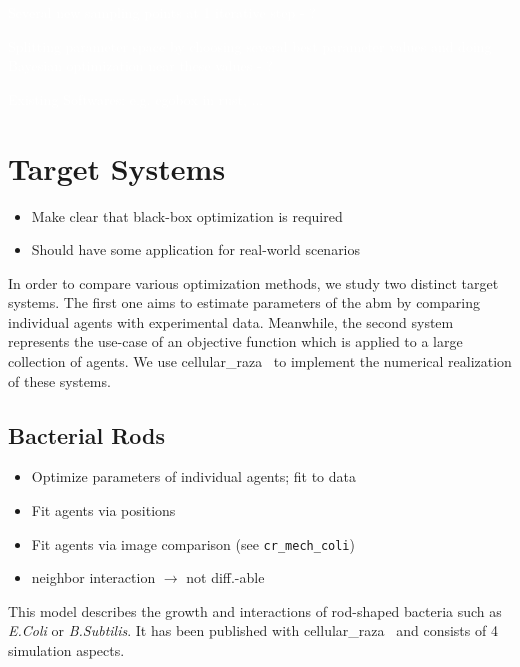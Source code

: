 \documentclass{article}
\newcommand{\todo}[1]{\colorbox{WildStrawberry}{\textcolor{white}{#1}}}
\begin{document}
\todo{Several new sampling points at 1 iterative step - ?}

\todo{Splitting parameter space by choosing several best parameter values and doing Bayesian optimization near these values - ?}

\todo{Existing Softwares: e.g. egobox in rust, ...}




\section{Target Systems}
\label{section:target-system}
\begin{itemize}
    \item Make clear that black-box optimization is required
    \item Should have some application for real-world scenarios
\end{itemize}

In order to compare various optimization methods, we study two distinct target systems.
The first one aims to estimate parameters of the \ac{abm} by comparing individual agents with
experimental data.
Meanwhile, the second system represents the use-case of an objective function which is applied to a
large collection of agents.
We use cellular\_raza~\cite{Pleyer2025} to implement the numerical realization of these systems.

\subsection{Bacterial Rods}
\label{subsection:bacterial-rods}
\begin{itemize}
    \item Optimize parameters of individual agents; fit to data
    \item Fit agents via positions
    \item Fit agents via image comparison (see \texttt{cr\_mech\_coli})
    \item neighbor interaction $\rightarrow$ not diff.-able
\end{itemize}

This model describes the growth and interactions of rod-shaped bacteria such as \textit{E.Coli} or
\textit{B.Subtilis}.
It has been published with cellular\_raza~\cite{Pleyer2025} and consists of 4 simulation aspects.
\end{document}
